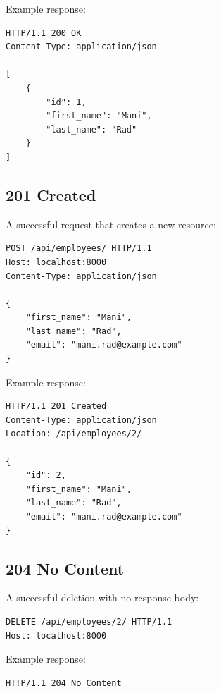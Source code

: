 \documentclass[a4paper]{article}
\begin{document}
            Example response:
            
            \begin{lstlisting}[style=httpstyle]
HTTP/1.1 200 OK
Content-Type: application/json

[
    {
        "id": 1,
        "first_name": "Mani",
        "last_name": "Rad"
    }
]
            \end{lstlisting}
        
        \subsection{201 Created}
            
            A successful request that creates a new resource:
            
            \begin{lstlisting}[style=httpstyle]
POST /api/employees/ HTTP/1.1
Host: localhost:8000
Content-Type: application/json

{
    "first_name": "Mani",
    "last_name": "Rad",
    "email": "mani.rad@example.com"
}
            \end{lstlisting}
            
            Example response:
            
            \begin{lstlisting}[style=httpstyle]
HTTP/1.1 201 Created
Content-Type: application/json
Location: /api/employees/2/

{
    "id": 2,
    "first_name": "Mani",
    "last_name": "Rad",
    "email": "mani.rad@example.com"
}
            \end{lstlisting}
        
        \subsection{204 No Content}
            
            A successful deletion with no response body:
            
            \begin{lstlisting}[style=httpstyle]
DELETE /api/employees/2/ HTTP/1.1
Host: localhost:8000
            \end{lstlisting}
            
            Example response:
            
            \begin{lstlisting}[style=httpstyle]
HTTP/1.1 204 No Content
            \end{lstlisting}
    
\end{document}
